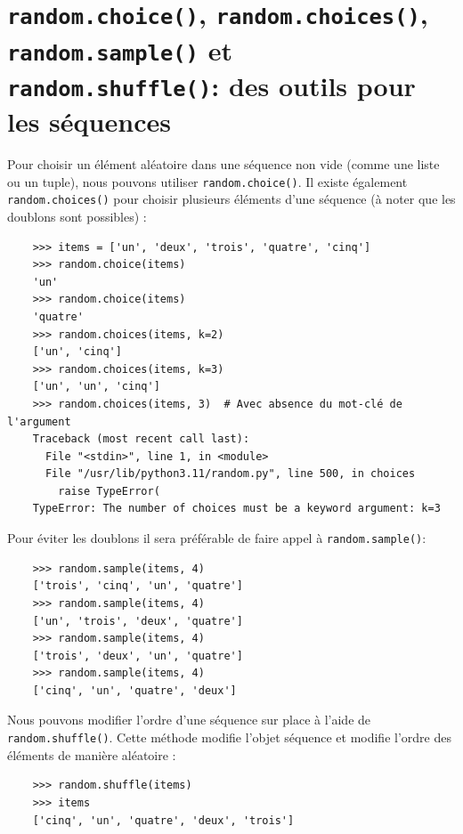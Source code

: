 \documentclass[a4paper,11pt]{book}
\begin{document}
\section{\texttt{random.choice()}, \texttt{random.choices()}, \texttt{random.sample()} et \\ \texttt{random.shuffle()}: des outils pour les séquences}
Pour choisir un élément aléatoire dans une séquence non vide (comme une liste ou un tuple), nous pouvons utiliser \texttt{random.choice()}. Il existe également \texttt{random.choices()} pour choisir plusieurs éléments d'une séquence (à noter que les doublons sont possibles) :
\begin{verbatim}
    >>> items = ['un', 'deux', 'trois', 'quatre', 'cinq']
    >>> random.choice(items)
    'un'
    >>> random.choice(items)
    'quatre'
    >>> random.choices(items, k=2)
    ['un', 'cinq']
    >>> random.choices(items, k=3)
    ['un', 'un', 'cinq']
    >>> random.choices(items, 3)  # Avec absence du mot-clé de l'argument
    Traceback (most recent call last):
      File "<stdin>", line 1, in <module>
      File "/usr/lib/python3.11/random.py", line 500, in choices
        raise TypeError(
    TypeError: The number of choices must be a keyword argument: k=3
\end{verbatim}
\medskip

Pour éviter les doublons il sera préférable de faire appel à \texttt{random.sample()}:
\begin{verbatim}
    >>> random.sample(items, 4)
    ['trois', 'cinq', 'un', 'quatre']
    >>> random.sample(items, 4)
    ['un', 'trois', 'deux', 'quatre']
    >>> random.sample(items, 4)
    ['trois', 'deux', 'un', 'quatre']
    >>> random.sample(items, 4)
    ['cinq', 'un', 'quatre', 'deux']
\end{verbatim}
\medskip

Nous pouvons modifier l'ordre d'une séquence sur place à l'aide de \texttt{random.shuffle()}. Cette méthode modifie l'objet séquence et modifie l'ordre des éléments de manière aléatoire :
\begin{verbatim}
    >>> random.shuffle(items)
    >>> items
    ['cinq', 'un', 'quatre', 'deux', 'trois']
\end{verbatim}
\medskip
\end{document}
